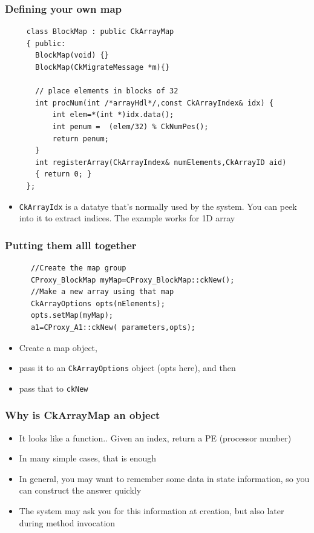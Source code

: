 \documentclass{beamer}
\begin{document}
\begin{frame}[fragile]
    \frametitle{Defining your own map}
    \begin{lstlisting}
     class BlockMap : public CkArrayMap
     { public:
       BlockMap(void) {}
       BlockMap(CkMigrateMessage *m){}

       // place elements in blocks of 32
       int procNum(int /*arrayHdl*/,const CkArrayIndex& idx) {
           int elem=*(int *)idx.data();
           int penum =  (elem/32) % CkNumPes();
           return penum;
       }
       int registerArray(CkArrayIndex& numElements,CkArrayID aid) 
       { return 0; }
     };
    \end{lstlisting}
    \begin{itemize}
        \item \texttt{CkArrayIdx} is a datatye that’s normally used by the system. You
        can peek into it to extract indices. The example works for 1D array
    \end{itemize}
\end{frame}

\begin{frame}[fragile]
    \frametitle{Putting them alll together}
    \begin{lstlisting}
      //Create the map group
      CProxy_BlockMap myMap=CProxy_BlockMap::ckNew();
      //Make a new array using that map
      CkArrayOptions opts(nElements);
      opts.setMap(myMap);
      a1=CProxy_A1::ckNew( parameters,opts);
    \end{lstlisting}
    \begin{itemize}
    \item Create a map object, 
    \item pass it to an \texttt{CkArrayOptions} object (opts here), and then 
    \item pass that to \texttt{ckNew}
    \end{itemize}
\end{frame}

\begin{frame}[fragile]
    \frametitle{Why is CkArrayMap an object}
    \begin{itemize}
      \item It looks like a function.. Given an index, return a PE (processor
      number)
      \item In many simple cases, that is enough
      \item In general, you may want to remember some data in state information, so you can construct the answer quickly
      \item The system may ask you for this information at creation, but also later during method invocation
    \end{itemize}
\end{frame}
\end{document}

